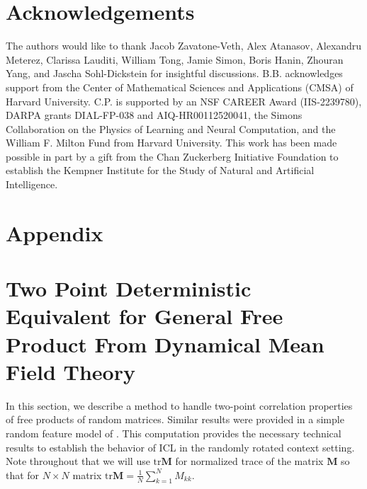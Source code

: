 \documentclass{article} %
\begin{document}
\section*{Acknowledgements}
The authors would like to thank Jacob Zavatone-Veth, Alex Atanasov, Alexandru Meterez, Clarissa Lauditi, William Tong, Jamie Simon, Boris Hanin, Zhouran Yang, and Jascha Sohl-Dickstein for insightful discussions. B.B. acknowledges support from the Center of Mathematical Sciences and Applications
(CMSA) of Harvard University. C.P. is supported by an NSF CAREER Award (IIS-2239780), DARPA grants DIAL-FP-038 and AIQ-HR00112520041, the Simons Collaboration on the Physics of Learning and Neural Computation, and the William F. Milton Fund from Harvard University. This work has been made possible in part by a gift from the Chan Zuckerberg Initiative Foundation to establish the Kempner Institute for the Study of Natural and Artificial Intelligence.




\pagebreak
\appendix
\section*{Appendix}


\section{Two Point Deterministic Equivalent for General Free Product From Dynamical Mean Field Theory}\label{app:two_point_det_equiv}

In this section, we describe a method to handle two-point correlation properties of free products of random matrices. Similar results were provided in a simple random feature model of \citep{bordelon2024dynamical, atanasov2025two}. This computation provides the necessary technical results to establish the behavior of ICL in the randomly rotated context setting. Note throughout that we will use $\text{tr} \bm M$ for normalized trace of the matrix $\bm M$ so that for $N \times N$ matrix $\text{tr} \bm M = \frac{1}{N} \sum_{k=1}^N M_{kk}$. 

 
\end{document}
